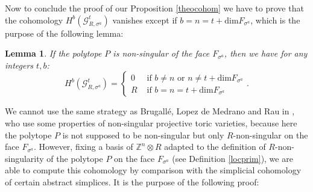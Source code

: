 \documentclass{article}
\newtheorem{lemma}{Lemma}
\begin{document}
Now to conclude the proof of our Proposition \ref{theocohom} we have to prove that the cohomology $H^{b}(\mathcal{G}^t_{R,\sigma^a})$ vanishes except if $b=n=t+\mathrm{dim}F_{\sigma^a}$, which is the purpose of the following lemma:

\begin{lemma}
    If the polytope $P$ is non-singular of the face $F_{\sigma^a}$, then we have for any integers $t,b$:
    \begin{equation*}
        H^{b}(\mathcal{G}^t_{R,\sigma^a}) = \left  \{ \begin{array}{ll}
             0 & \text{ if } b \neq n \text{ or } n \neq t+\mathrm{dim}F_{\sigma^a} \\
             R& \text{ if } b = n = t+\mathrm{dim}F_{\sigma^a}
        \end{array} \right. .
    \end{equation*}
    \label{homwedge}
\end{lemma}

We cannot use the same strategy as Brugallé, Lopez de Medrano and Rau in \cite{BMR 2024}, who use some properties of non-singular projective toric varieties, because here the polytope $P$ is not supposed to be non-singular but only $R$-non-singular on the face $F_{\sigma^a}$. However, fixing a basis of $\mathbb{Z}^n\otimes R$ adapted to the definition of $R$-non-singularity of the polytope $P$ on the face $F_{\sigma^a}$ (see Definition \ref{locprim}), we are able to compute this cohomology by comparison with the simplicial cohomology of certain abstract simplices. It is the purpose of the following proof:
\end{document}
